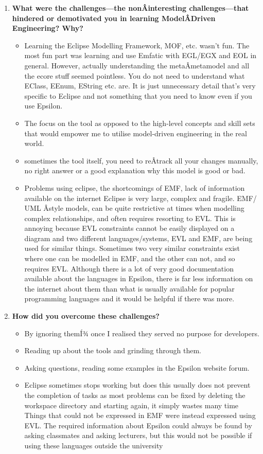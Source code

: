 \documentclass[12pt, a4paper]{report}
\begin{document}
\begin{appendices}
\begin{enumerate}
\item \textbf{ What were the challenges---the nonÂ­interesting challenges---that hindered or demotivated you in learning ModelÂ­Driven Engineering? Why?}
\begin{itemize}
\item Learning the Eclipse Modelling Framework, MOF, etc. wasn't fun. The most fun part was learning and use Emfatic with EGL/EGX and EOL in general. However, actually understanding the metaÂ­metamodel and all the ecore stuff seemed pointless. You do not need to understand what EClass, EEnum, EString etc. are. It is just unnecessary detail that's very specific to
Eclipse and not something that you need to know even if you use Epsilon.
\item The focus on the tool as opposed to the high-level concepts and skill sets that would empower me to utilise model-driven engineering in the real world.
\item sometimes the tool itself, you need to reÂ­track all your changes manually, no right answer or a good explanation why this model is good or bad.
\item Problems using eclipse, the shortcomings of EMF, lack of information available on the internet Eclipse is very large, complex and fragile. EMF/ UML Â­style models, can be quite restrictive at times when modelling complex relationships, and often requires resorting to EVL. This is annoying because EVL constraints cannot be easily displayed on a diagram and two different languages/systems, EVL and EMF, are being used for similar things. Sometimes two very similar constraints exist where one can be modelled in EMF, and the other can not, and so requires EVL. Although there is a lot of very good documentation available about the languages in Epsilon, there is far less information on the internet about them than what is usually available for popular programming languages and it would be helpful if there was more.
\end{itemize}

\item \textbf{How did you overcome these challenges?}
\begin{itemize}
\item By ignoring themÍ¾ once I realised they served no purpose for developers.
\item Reading up about the tools and grinding through them.
\item Asking questions, reading some examples in the Epsilon website forum.
\item Eclipse sometimes stops working but does this usually does not prevent the completion of tasks as most problems can be fixed by deleting the workspace directory and starting again, it simply wastes many time Things that could not be expressed in EMF were instead expressed using EVL. The required information about Epsilon could always be found by
asking classmates and asking lecturers, but this would not be possible if using these languages outside the university
\end{itemize}
\end{enumerate}


\end{appendices}
\end{document}
